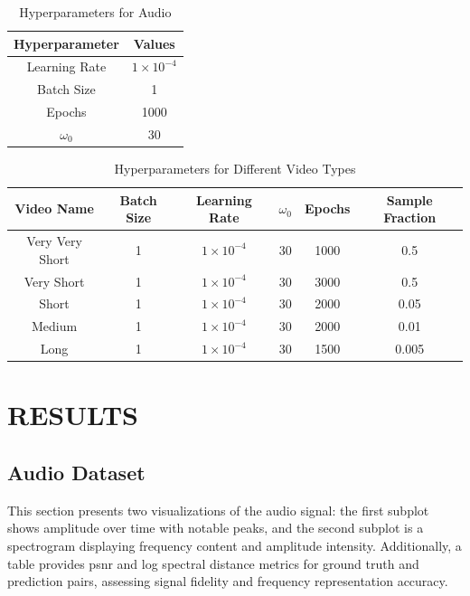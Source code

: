 \documentclass{ioereport}
\begin{document}
\begin{table}[H]
    \caption{Hyperparameters for Audio}
    \centering
    \begin{tabular}{|c|c|}
    \hline
    \textbf{Hyperparameter} & \textbf{Values} \\
    \hline
    Learning Rate & \( 1 \times 10^{-4} \) \\
    \hline
    Batch Size & 1 \\
    \hline
    Epochs & 1000 \\
    \hline
    \( \omega_0 \) & 30 \\
    \hline
    \end{tabular}
    \label{tab:hyperparameters-audio}
\end{table}



\begin{table}[H]
    \caption{Hyperparameters for Different Video Types}
    \centering
    \begin{tabular}{|c|c|c|c|c|c|}
    \hline
    \textbf{Video Name} & \textbf{Batch Size} & \textbf{Learning Rate} & \textbf{\( \omega_0 \)} & \textbf{Epochs} & \textbf{Sample Fraction} \\
    \hline
    Very Very Short & 1 & \( 1 \times 10^{-4} \) & 30 & 1000 & 0.5 \\
    \hline
    Very Short & 1 & \( 1 \times 10^{-4} \) & 30 & 3000 & 0.5 \\
    \hline
    Short & 1 & \( 1 \times 10^{-4} \) & 30 & 2000 & 0.05 \\
    \hline
    Medium & 1 & \( 1 \times 10^{-4} \) & 30 & 2000 & 0.01 \\
    \hline
    Long & 1 & \( 1 \times 10^{-4} \) & 30 & 1500 & 0.005 \\
    \hline
    \end{tabular}
    \label{tab:hyperparameters-video}
\end{table}



\pagebreak 

\section{\MakeUppercase{Results}}

    
    \subsection{Audio Dataset}
    This section presents two visualizations of the audio signal: the first subplot shows amplitude over time with notable peaks, and the second subplot is a spectrogram displaying frequency content and amplitude intensity. Additionally, a table provides \gls{psnr} and log spectral distance metrics for ground truth and prediction pairs, assessing signal fidelity and frequency representation accuracy.
    
\end{document}
